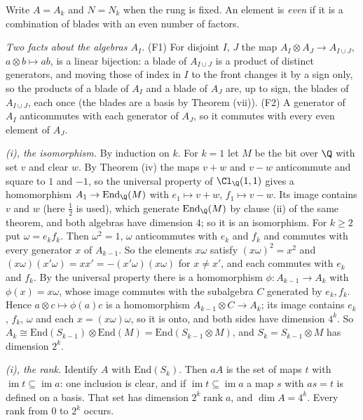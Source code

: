 Write $A = A_{k}$ and $N = N_{k}$ when the rung is fixed. An element is \emph{even} if it is a combination of blades with an even number of factors.

\emph{Two facts about the algebras $A_{I}$.} (F1) For disjoint $I$, $J$ the map $A_{I} \otimes A_{J} \to A_{I \cup J}$, $a \otimes b \mapsto ab$, is a linear bijection: a blade of $A_{I \cup J}$ is a product of distinct generators, and moving those of index in $I$ to the front changes it by a sign only, so the products of a blade of $A_{I}$ and a blade of $A_{J}$ are, up to sign, the blades of $A_{I \cup J}$, each once (the blades are a basis by Theorem (vii)). (F2) A generator of $A_{I}$ anticommutes with each generator of $A_{J}$, so it commutes with every even element of $A_{J}$.

\emph{(i), the isomorphism.} By induction on $k$. For $k = 1$ let $M$ be the bit over $\Q$ with set $v$ and clear $w$. By Theorem (iv) the maps $v + w$ and $v - w$ anticommute and square to $1$ and $-1$, so the universal property of $\Cl_{\Q}(1,1)$ gives a homomorphism $A_{1} \to \mathrm{End}_{\Q}(M)$ with $e_{1} \mapsto v + w$, $f_{1} \mapsto v - w$. Its image contains $v$ and $w$ (here $\tfrac12$ is used), which generate $\mathrm{End}_{\Q}(M)$ by clause (ii) of the same theorem, and both algebras have dimension $4$; so it is an isomorphism. For $k \ge 2$ put $\omega = e_{k}f_{k}$. Then $\omega^{2} = 1$, $\omega$ anticommutes with $e_{k}$ and $f_{k}$ and commutes with every generator $x$ of $A_{k-1}$. So the elements $x\omega$ satisfy $(x\omega)^{2} = x^{2}$ and $(x\omega)(x'\omega) = xx' = -(x'\omega)(x\omega)$ for $x \ne x'$, and each commutes with $e_{k}$ and $f_{k}$. By the universal property there is a homomorphism $\phi : A_{k-1} \to A_{k}$ with $\phi(x) = x\omega$, whose image commutes with the subalgebra $C$ generated by $e_{k}, f_{k}$. Hence $a \otimes c \mapsto \phi(a)c$ is a homomorphism $A_{k-1} \otimes C \to A_{k}$; its image contains $e_{k}$, $f_{k}$, $\omega$ and each $x = (x\omega)\omega$, so it is onto, and both sides have dimension $4^{k}$. So $A_{k} \cong \mathrm{End}(S_{k-1}) \otimes \mathrm{End}(M) = \mathrm{End}(S_{k-1} \otimes M)$, and $S_{k} = S_{k-1} \otimes M$ has dimension $2^{k}$.

\emph{(i), the rank.} Identify $A$ with $\mathrm{End}(S_{k})$. Then $aA$ is the set of maps $t$ with $\operatorname{im} t \subseteq \operatorname{im} a$: one inclusion is clear, and if $\operatorname{im} t \subseteq \operatorname{im} a$ a map $s$ with $as = t$ is defined on a basis. That set has dimension $2^{k}\operatorname{rank}a$, and $\dim A = 4^{k}$. Every rank from $0$ to $2^{k}$ occurs.


